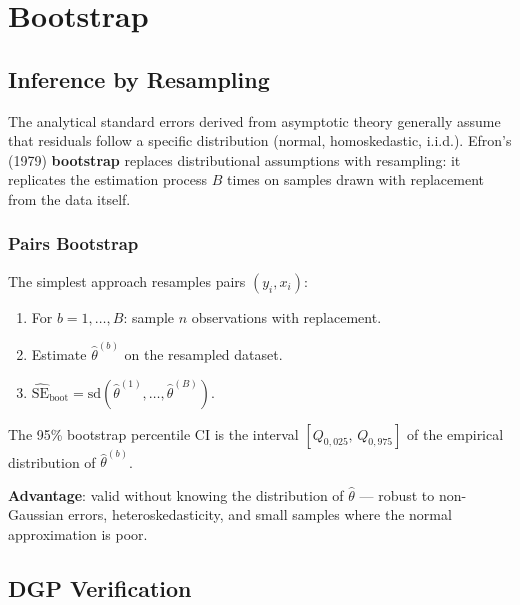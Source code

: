 \chapter{Bootstrap}
\label{cap:bootstrap}

\section{Inference by Resampling}

The analytical standard errors derived from asymptotic theory generally assume
that residuals follow a specific distribution (normal, homoskedastic, i.i.d.).
Efron's (1979) \textbf{bootstrap} replaces distributional assumptions with
resampling: it replicates the estimation process $B$ times on samples drawn
with replacement from the data itself.

\subsection*{Pairs Bootstrap}

The simplest approach resamples pairs $(y_i, x_i)$:

\begin{enumerate}
  \item For $b = 1,\ldots,B$: sample $n$ observations with replacement.
  \item Estimate $\hat\theta^{(b)}$ on the resampled dataset.
  \item $\widehat{\mathrm{SE}}_{\mathrm{boot}} = \mathrm{sd}(\hat\theta^{(1)},\ldots,\hat\theta^{(B)})$.
\end{enumerate}

The 95\% bootstrap percentile CI is the interval $[Q_{0{,}025},\, Q_{0{,}975}]$
of the empirical distribution of $\hat\theta^{(b)}$.

\textbf{Advantage}: valid without knowing the distribution of $\hat\theta$ —
robust to non-Gaussian errors, heteroskedasticity, and small samples where the
normal approximation is poor.

\section{DGP Verification}

